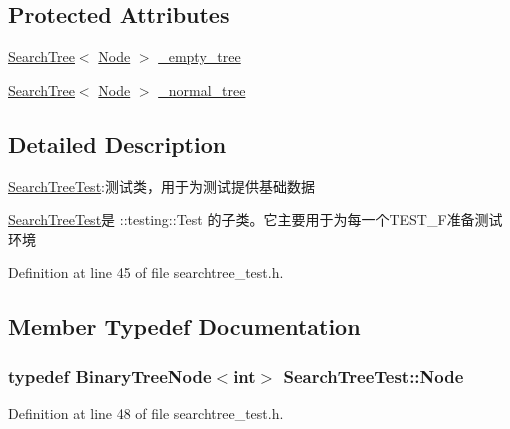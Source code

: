 \subsection*{Protected Attributes}
\begin{DoxyCompactItemize}
\item 
\hyperlink{class_introduction_to_algorithm_1_1_tree_algorithm_1_1_search_tree}{Search\+Tree}$<$ \hyperlink{class_search_tree_test_a921d5813f947eb9b70417b69722bc050}{Node} $>$ \hyperlink{class_search_tree_test_a08832932ab11e000dcd1ba60da8bad5f}{\+\_\+empty\+\_\+tree}
\item 
\hyperlink{class_introduction_to_algorithm_1_1_tree_algorithm_1_1_search_tree}{Search\+Tree}$<$ \hyperlink{class_search_tree_test_a921d5813f947eb9b70417b69722bc050}{Node} $>$ \hyperlink{class_search_tree_test_a9982df0c932b171ff29dfe7abcebdc05}{\+\_\+normal\+\_\+tree}
\end{DoxyCompactItemize}


\subsection{Detailed Description}
\hyperlink{class_search_tree_test}{Search\+Tree\+Test}\+:测试类，用于为测试提供基础数据 

{\ttfamily \hyperlink{class_search_tree_test}{Search\+Tree\+Test}}是 {\ttfamily \+::testing\+::\+Test} 的子类。它主要用于为每一个{\ttfamily T\+E\+S\+T\+\_\+\+F}准备测试环境 

Definition at line 45 of file searchtree\+\_\+test.\+h.



\subsection{Member Typedef Documentation}
\hypertarget{class_search_tree_test_a921d5813f947eb9b70417b69722bc050}{}
\subsubsection[{Node}]{\setlength{\rightskip}{0pt plus 5cm}typedef {\bf Binary\+Tree\+Node}$<$int$>$ {\bf Search\+Tree\+Test\+::\+Node}}\label{class_search_tree_test_a921d5813f947eb9b70417b69722bc050}


Definition at line 48 of file searchtree\+\_\+test.\+h.



